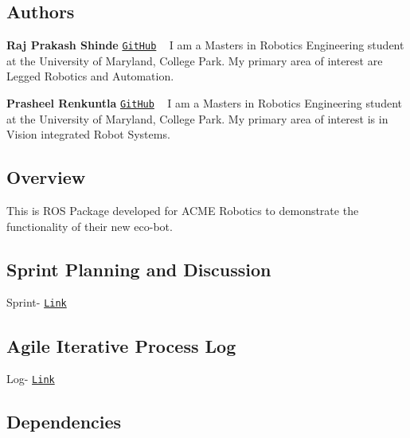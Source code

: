 

\href{https://travis-ci.org/Prasheel24/Object-Collector-Robot}{\tt } \href{https://coveralls.io/github/Prasheel24/Object-Collector-Robot?branch=master}{\tt } \href{https://github.com/Prasheel24/Object-Collector-Robot/blob/master/LICENSE}{\tt }

\subsection*{Authors}


\begin{DoxyItemize}
\item {\bfseries Raj Prakash Shinde} \href{https://github.com/RajPShinde}{\tt Git\+Hub} ~\newline
I am a Masters in Robotics Engineering student at the University of Maryland, College Park. My primary area of interest are Legged Robotics and Automation.
\item {\bfseries Prasheel Renkuntla} \href{https://github.com/Prasheel24}{\tt Git\+Hub} ~\newline
I am a Master\textquotesingle{}s in Robotics Engineering student at the University of Maryland, College Park. My primary area of interest is in Vision integrated Robot Systems.
\end{DoxyItemize}

\subsection*{Overview}

This is R\+OS Package developed for A\+C\+ME Robotics to demonstrate the functionality of their new eco-\/bot.

\subsection*{Sprint Planning and Discussion}

Sprint-\/ \href{https://docs.google.com/document/d/1_uG7fMXPrtZlpRLsgD74NdLRX3DKDXxCicppZWBDNvQ}{\tt Link}

\subsection*{Agile Iterative Process Log}

Log-\/ \href{https://docs.google.com/spreadsheets/d/1DkxCx4_GxvRXjRTTrmgZvdOQ4z0DMrpGEavg439tQak}{\tt Link}

\subsection*{Dependencies}


